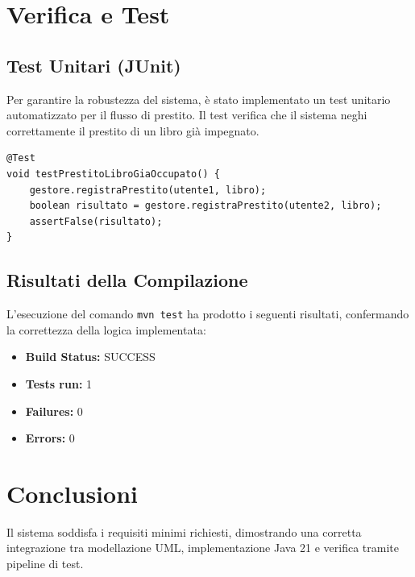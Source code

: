 \documentclass[12pt, a4paper]{article}
\begin{document}
\section{Verifica e Test}
\subsection{Test Unitari (JUnit)}
Per garantire la robustezza del sistema, è stato implementato un test unitario automatizzato per il flusso di prestito. Il test verifica che il sistema neghi correttamente il prestito di un libro già impegnato.

\begin{lstlisting}[caption={Esempio di Test Unitario per il Prestito}]
@Test
void testPrestitoLibroGiaOccupato() {
    gestore.registraPrestito(utente1, libro);
    boolean risultato = gestore.registraPrestito(utente2, libro);
    assertFalse(risultato);
}
\end{lstlisting}

\subsection{Risultati della Compilazione}
L'esecuzione del comando \texttt{mvn test} ha prodotto i seguenti risultati, confermando la correttezza della logica implementata:
\begin{itemize}
    \item \textbf{Build Status:} SUCCESS
    \item \textbf{Tests run:} 1
    \item \textbf{Failures:} 0
    \item \textbf{Errors:} 0
\end{itemize}

\section{Conclusioni}
Il sistema soddisfa i requisiti minimi richiesti, dimostrando una corretta integrazione tra modellazione UML, implementazione Java 21 e verifica tramite pipeline di test.
\end{document}
